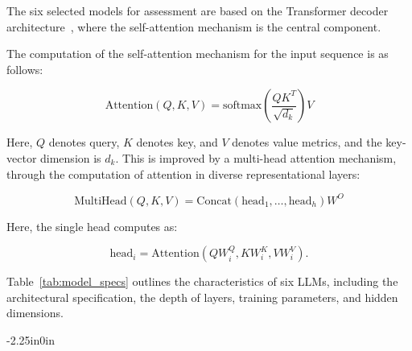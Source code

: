 \documentclass[10pt,letterpaper]{article}
\begin{document}
The six selected models for assessment are based on the Transformer decoder architecture~\cite{b35}, where the self-attention mechanism is the central component.

The computation of the self-attention mechanism for the input sequence is as follows:

\begin{equation}
\text{Attention}(Q, K, V) = \text{softmax}\left(\frac{QK^{T}}{\sqrt{d_k}}\right)V
\label{eq:attention}
\end{equation}

Here, \(Q\) denotes query, \(K\) denotes key, and \(V\) denotes value metrics, and the key-vector dimension is \(d_k\). This is improved by a multi-head attention mechanism, through the computation of attention in diverse representational layers:

\begin{equation}
\text{MultiHead}(Q, K, V) = \text{Concat}(\text{head}_1, \ldots, \text{head}_h)W^{O}
\label{eq:multihead}
\end{equation}

Here, the single head computes as: 

\begin{equation}
\text{head}_i = \text{Attention}(QW^{Q}_i, KW^{K}_i, VW^{V}_i).
\label{eq:head}
\end{equation}

Table~\ref{tab:model_specs} outlines the characteristics of six LLMs, including the architectural specification, the depth of layers, training parameters, and hidden dimensions.  

\begin{table}[!t]
\begin{adjustwidth}{-2.25in}{0in}
\centering
\caption{Detailed Architectural Specifications of Evaluated Large Language Models.}
\label{tab:model_specs}
\renewcommand{\arraystretch}{1.2}
\setlength{\tabcolsep}{5pt}
\end{adjustwidth}
\vspace{-0.3cm}
\end{table}
\end{document}
